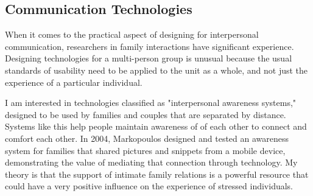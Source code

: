   \subsection{Communication Technologies}
    When it comes to the practical aspect of designing for interpersonal
    communication, researchers in family interactions have significant experience.
    Designing technologies for a multi-person group is unusual because the usual
    standards of usability need to be applied to the unit as a whole, and not just
    the experience of a particular individual. \cite{neustaedter12}

    I am interested in technologies classified as "interpersonal awareness systems,"
    designed to be used by families and couples that are separated by distance.
    Systems like this help people maintain awareness of  of each other to connect
    and comfort each other. \cite{neustaedter06}
    In 2004, Markopoulos designed and tested an
    awareness system for families that shared pictures and snippets from a mobile
    device, demonstrating the value of mediating that connection through technology.
    \cite{markopoulos04}
    My theory is that the support of intimate family relations is a powerful
    resource that could
    have a very positive influence on the experience of stressed individuals.
